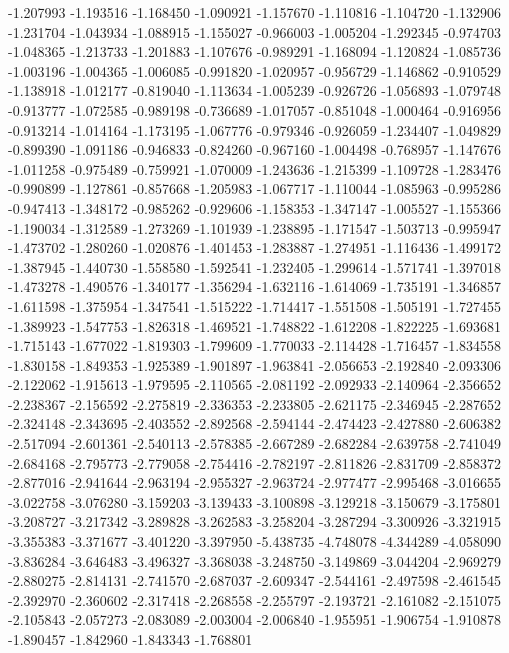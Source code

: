 -1.207993
-1.193516
-1.168450
-1.090921
-1.157670
-1.110816
-1.104720
-1.132906
-1.231704
-1.043934
-1.088915
-1.155027
-0.966003
-1.005204
-1.292345
-0.974703
-1.048365
-1.213733
-1.201883
-1.107676
-0.989291
-1.168094
-1.120824
-1.085736
-1.003196
-1.004365
-1.006085
-0.991820
-1.020957
-0.956729
-1.146862
-0.910529
-1.138918
-1.012177
-0.819040
-1.113634
-1.005239
-0.926726
-1.056893
-1.079748
-0.913777
-1.072585
-0.989198
-0.736689
-1.017057
-0.851048
-1.000464
-0.916956
-0.913214
-1.014164
-1.173195
-1.067776
-0.979346
-0.926059
-1.234407
-1.049829
-0.899390
-1.091186
-0.946833
-0.824260
-0.967160
-1.004498
-0.768957
-1.147676
-1.011258
-0.975489
-0.759921
-1.070009
-1.243636
-1.215399
-1.109728
-1.283476
-0.990899
-1.127861
-0.857668
-1.205983
-1.067717
-1.110044
-1.085963
-0.995286
-0.947413
-1.348172
-0.985262
-0.929606
-1.158353
-1.347147
-1.005527
-1.155366
-1.190034
-1.312589
-1.273269
-1.101939
-1.238895
-1.171547
-1.503713
-0.995947
-1.473702
-1.280260
-1.020876
-1.401453
-1.283887
-1.274951
-1.116436
-1.499172
-1.387945
-1.440730
-1.558580
-1.592541
-1.232405
-1.299614
-1.571741
-1.397018
-1.473278
-1.490576
-1.340177
-1.356294
-1.632116
-1.614069
-1.735191
-1.346857
-1.611598
-1.375954
-1.347541
-1.515222
-1.714417
-1.551508
-1.505191
-1.727455
-1.389923
-1.547753
-1.826318
-1.469521
-1.748822
-1.612208
-1.822225
-1.693681
-1.715143
-1.677022
-1.819303
-1.799609
-1.770033
-2.114428
-1.716457
-1.834558
-1.830158
-1.849353
-1.925389
-1.901897
-1.963841
-2.056653
-2.192840
-2.093306
-2.122062
-1.915613
-1.979595
-2.110565
-2.081192
-2.092933
-2.140964
-2.356652
-2.238367
-2.156592
-2.275819
-2.336353
-2.233805
-2.621175
-2.346945
-2.287652
-2.324148
-2.343695
-2.403552
-2.892568
-2.594144
-2.474423
-2.427880
-2.606382
-2.517094
-2.601361
-2.540113
-2.578385
-2.667289
-2.682284
-2.639758
-2.741049
-2.684168
-2.795773
-2.779058
-2.754416
-2.782197
-2.811826
-2.831709
-2.858372
-2.877016
-2.941644
-2.963194
-2.955327
-2.963724
-2.977477
-2.995468
-3.016655
-3.022758
-3.076280
-3.159203
-3.139433
-3.100898
-3.129218
-3.150679
-3.175801
-3.208727
-3.217342
-3.289828
-3.262583
-3.258204
-3.287294
-3.300926
-3.321915
-3.355383
-3.371677
-3.401220
-3.397950
-5.438735
-4.748078
-4.344289
-4.058090
-3.836284
-3.646483
-3.496327
-3.368038
-3.248750
-3.149869
-3.044204
-2.969279
-2.880275
-2.814131
-2.741570
-2.687037
-2.609347
-2.544161
-2.497598
-2.461545
-2.392970
-2.360602
-2.317418
-2.268558
-2.255797
-2.193721
-2.161082
-2.151075
-2.105843
-2.057273
-2.083089
-2.003004
-2.006840
-1.955951
-1.906754
-1.910878
-1.890457
-1.842960
-1.843343
-1.768801
